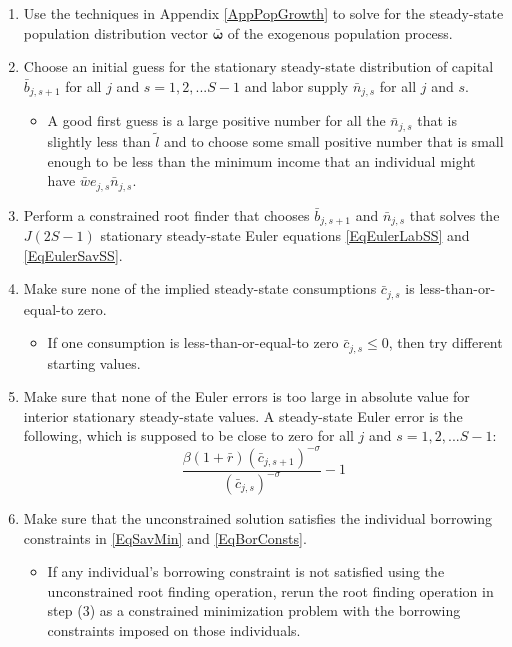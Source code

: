\documentclass[letterpaper,12pt]{article}
\theoremstyle{definition}
\begin{document}
  \begin{enumerate}
    \item Use the techniques in Appendix \ref{AppPopGrowth} to solve for the steady-state population distribution vector $\bm{\bar{\omega}}$ of the exogenous population process.
    \item Choose an initial guess for the stationary steady-state distribution of capital $\bar{b}_{j,s+1}$ for all $j$ and $s=1,2,...S-1$ and labor supply $\bar{n}_{j,s}$ for all $j$ and $s$.
      \begin{itemize}
        \item A good first guess is a large positive number for all the $\bar{n}_{j,s}$ that is slightly less than $\tilde{l}$ and to choose some small positive number that is small enough to be less than the minimum income that an individual might have $\bar{w}e_{j,s}\bar{n}_{j,s}$.
      \end{itemize}
    \item Perform a constrained root finder that chooses $\bar{b}_{j,s+1}$ and $\bar{n}_{j,s}$ that solves the $J(2S-1)$ stationary steady-state Euler equations \eqref{EqEulerLabSS} and \eqref{EqEulerSavSS}.
    \item Make sure none of the implied steady-state consumptions $\bar{c}_{j,s}$ is less-than-or-equal-to zero.
      \begin{itemize}
        \item If one consumption is less-than-or-equal-to zero $\bar{c}_{j,s}\leq 0$, then try different starting values.
      \end{itemize}
    \item Make sure that none of the Euler errors is too large in absolute value for interior stationary steady-state values. A steady-state Euler error is the following, which is supposed to be close to zero for all $j$ and $s=1,2,...S-1$:
      \begin{equation}\label{EqSSeulerr}
        \frac{\beta \left(1+\bar{r}\right)\left(\bar{c}_{j,s+1}\right)^{-\sigma}}{\left(\bar{c}_{j,s}\right)^{-\sigma}} - 1
      \end{equation}
    \item Make sure that the unconstrained solution satisfies the individual borrowing constraints in \eqref{EqSavMin} and \eqref{EqBorConsts}.
      \begin{itemize}
        \item If any individual's borrowing constraint is not satisfied using the unconstrained root finding operation, rerun the root finding operation in step (3) as a constrained minimization problem with the borrowing constraints imposed on those individuals.

\end{itemize}
\end{enumerate}
\end{document}
